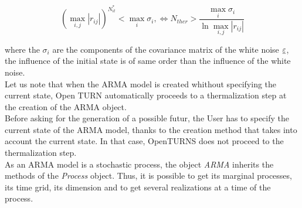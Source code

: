 \begin{equation}\label{nitEt}
  \left( \max_{i,j} |r_{ij}| \right)^{N_{it}^*} <  \max_{i} \sigma_i, \Longleftrightarrow N_{ther} > \displaystyle \frac{\max_{i} \sigma_i}{\ln \max_{i,j} |r_{ij}|}
\end{equation}

where the $\sigma_i$ are the components of the covariance matrix of the white noise ${\underline{\varepsilon}}$,  the influence of the initial state is of same order than the influence of the white noise.\\


Let us note that when the ARMA model is created whithout specifying the current state, Open TURN automatically proceeds to a  thermalization step at the creation of the ARMA object. \\
Before asking for the generation of a possible futur, the User has to specify the current state of the ARMA model, thanks to the creation method that takes into account the current state. In that case, OpenTURNS does not proceed to the thermalization step.\\

As an ARMA model is a stochastic process, the object \textit{ARMA} inherits the methods of the \textit{Process} object. Thus, it is possible to get its marginal processes, its time grid, its dimension and to get several realizations at a time of the process.\\




